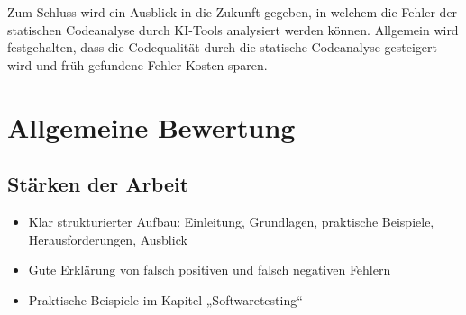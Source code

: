 \documentclass[a4paper,DIV=16]{scrartcl}
\begin{document}
Zum Schluss wird ein Ausblick in die Zukunft gegeben, in welchem die Fehler der
statischen Codeanalyse durch KI-Tools analysiert werden können. Allgemein wird
festgehalten, dass die Codequalität durch die statische Codeanalyse gesteigert
wird und früh gefundene Fehler Kosten sparen.







\section*{Allgemeine Bewertung}

\subsection*{Stärken der Arbeit}

\begin{itemize}
  \item Klar strukturierter Aufbau: Einleitung, Grundlagen, praktische
  Beispiele, Herausforderungen, Ausblick
  \item Gute Erklärung von falsch positiven und falsch negativen Fehlern
  \item Praktische Beispiele im Kapitel „Softwaretesting“
\end{itemize}
\end{document}
